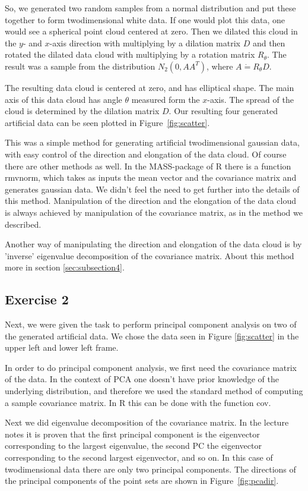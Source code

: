 \documentclass{article}
\begin{document}
So, we generated two random samples from a normal distribution and put these
together to form twodimensional white data. If one would plot this
data, one would see a spherical point cloud centered at zero. Then we
dilated this cloud in the $y$- and $x$-axis direction with multiplying by a dilation matrix $D$ and then rotated
the dilated data cloud with multiplying by a rotation matrix
$R_\theta$. The result was a sample from the 
distribution $N_2(0,AA^T)$, where $A \dot{=} R_\theta D$.

The resulting data cloud is centered at zero, and has elliptical
shape. The main axis of this data cloud has angle $\theta$ measured
form the $x$-axis. The spread of the cloud is determined by the
dilation matrix $D$. Our resulting four generated artificial data can be
seen plotted in Figure~\ref{fig:scatter}. 

This was a simple method for generating artificial twodimensional
gaussian data, with easy control of the direction and elongation of
the data cloud. Of course there are other methods as well. In the
MASS-package of R there is a function rmvnorm, which takes as
inputs the mean vector and the covariance matrix and generates
gaussian data. We
didn't feel the need to get further into the details of this
method. Manipulation of the direction and the elongation of the data
cloud is always achieved by manipulation of the covariance matrix, as
in the method we described.

Another way of manipulating the direction and elongation of the data
cloud is by 'inverse' eigenvalue decomposition of the covariance
matrix. About this method more in section \ref{sec:subsection4}.

\subsection{Exercise 2}

Next, we were given the task to perform principal component analysis
on two of the generated artificial data. We chose the data seen in
Figure \ref{fig:scatter} in the upper left and lower left frame.

In order to do principal component analysis, we first need the
covariance matrix of the data. In the context of PCA one doesn't have
prior knowledge of the underlying distribution, and therefore we used
the standard method of computing a sample covariance matrix. In R this
can be done with the function cov. 

Next we did eigenvalue decomposition of the covariance matrix. In the
lecture notes it is proven that the first principal component is the
eigenvector corresponding to the largest eigenvalue, the second PC the
eigenvector corresponding to the second largest eigenvector, and so
on. In this case of twodimensional data there are only two principal
components. The directions of the principal components of the point
sets are shown in Figure~\ref{fig:pcadir}. 
\end{document}
